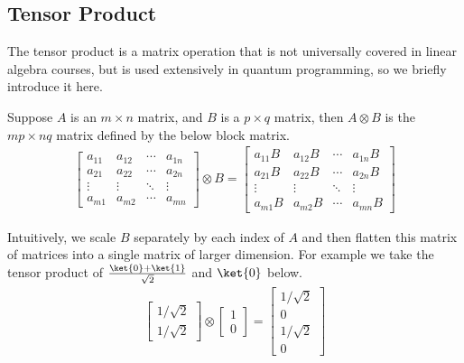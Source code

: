 \subsection{Tensor Product}
The tensor product is a matrix operation that is not universally covered in linear algebra courses, but is used extensively in quantum programming, so we briefly introduce it here.
\begin{definition}
Suppose $A$ is an $m \times n$ matrix, and $B$ is a $p\times q$ matrix, then $A\otimes B$ is the $mp \times nq$ matrix defined by the below block matrix.
\begin{align*}
    \begin{bmatrix}
        a_{11} & a_{12} & \cdots &a_{1n}\\
        a_{21} & a_{22} & \cdots &a_{2n}\\
        \vdots & \vdots & \ddots & \vdots \\
        a_{m1} & a_{m2} & \cdots & a_{mn}
    \end{bmatrix} 
    \otimes B = 
    \begin{bmatrix}
        a_{11}B & a_{12}B & \cdots &a_{1n}B\\
        a_{21}B & a_{22}B & \cdots &a_{2n}B\\
        \vdots & \vdots & \ddots & \vdots \\
        a_{m1}B & a_{m2}B & \cdots & a_{mn}B
    \end{bmatrix}
\end{align*}
\end{definition}
Intuitively, we scale $B$ separately by each index of $A$ and then flatten this matrix of matrices into a single matrix of larger dimension.
For example we take the tensor product of $\frac{\ket{0} + \ket{1}}{\sqrt{2}}$ and $\ket{0}$ below.
\begin{align*}
    \begin{bmatrix} 1 / \sqrt{2} \\ 1 / \sqrt{2} \end{bmatrix} \otimes \begin{bmatrix} 1 \\ 0 \end{bmatrix}   = 
\begin{bmatrix} 1 / \sqrt{2} \\ 0 \\ 1 / \sqrt{2}  \\ 0 \end{bmatrix}
\end{align*}
